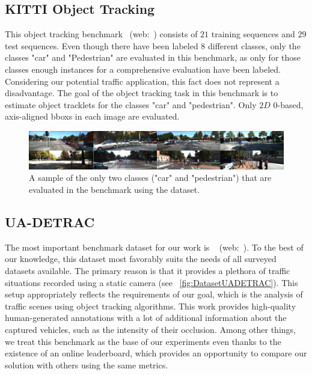 \subsection{KITTI Object Tracking}
\label{ssec:DatasetKITTIObjectTracking}

This object tracking benchmark~\cite{geiger2012cvpr} (web:~\cite{webkittiobjtrackingdataset}) consists of $21$ training sequences and $29$ test sequences. Even though there have been labeled $8$ different classes, only the classes "car" and "Pedestrian" are evaluated in this benchmark, as only for those classes enough instances for a comprehensive evaluation have been labeled. Considering our potential traffic application, this fact does not represent a disadvantage. The goal of the object tracking task in this benchmark is to estimate object tracklets for the classes "car" and "pedestrian". Only $2D$ $0$-based, axis-aligned \glspl{bbox} in each image are evaluated.

\begin{figure}[t]
    \centerline{\includegraphics[width=\linewidth]{figures/datasets/kitti_object_tracking_sample.jpg}}
    \caption[ dataset]{A sample of the only two classes ("car" and "pedestrian") that are evaluated in the benchmark using the  dataset. }
    \label{fig:DatasetKITTIObjectTracking}
\end{figure}

\subsection{UA-DETRAC}
\label{ssec:DatasetUADETRAC}

The most important benchmark dataset for our work is \uadetrac{}~\cite{wen2020uadetrac} (web:~\cite{webuadetracdataset}). To the best of our knowledge, this dataset most favorably suits the needs of all surveyed datasets available. The primary reason is that it provides a plethora of traffic situations recorded using a static camera (see \figstr{}~\ref{fig:DatasetUADETRAC}). This setup appropriately reflects the requirements of our goal, which is the analysis of traffic scenes using object tracking algorithms. This work provides high-quality human-generated annotations with a lot of additional information about the captured vehicles, such as the intensity of their occlusion. Among other things, we treat this benchmark as the base of our experiments even thanks to the existence of an online leaderboard, which provides an opportunity to compare our solution with others using the same metrics.


